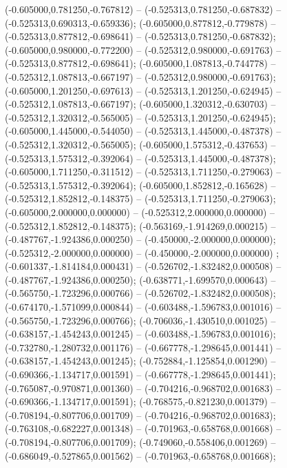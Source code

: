 (-0.605000,0.781250,-0.767812) -- (-0.525313,0.781250,-0.687832) -- (-0.525313,0.690313,-0.659336);
 (-0.605000,0.877812,-0.779878) -- (-0.525313,0.877812,-0.698641) -- (-0.525313,0.781250,-0.687832);
 (-0.605000,0.980000,-0.772200) -- (-0.525312,0.980000,-0.691763) -- (-0.525313,0.877812,-0.698641);
 (-0.605000,1.087813,-0.744778) -- (-0.525312,1.087813,-0.667197) -- (-0.525312,0.980000,-0.691763);
 (-0.605000,1.201250,-0.697613) -- (-0.525313,1.201250,-0.624945) -- (-0.525312,1.087813,-0.667197);
 (-0.605000,1.320312,-0.630703) -- (-0.525312,1.320312,-0.565005) -- (-0.525313,1.201250,-0.624945);
 (-0.605000,1.445000,-0.544050) -- (-0.525313,1.445000,-0.487378) -- (-0.525312,1.320312,-0.565005);
 (-0.605000,1.575312,-0.437653) -- (-0.525313,1.575312,-0.392064) -- (-0.525313,1.445000,-0.487378);
 (-0.605000,1.711250,-0.311512) -- (-0.525313,1.711250,-0.279063) -- (-0.525313,1.575312,-0.392064);
 (-0.605000,1.852812,-0.165628) -- (-0.525312,1.852812,-0.148375) -- (-0.525313,1.711250,-0.279063);
 (-0.605000,2.000000,0.000000) -- (-0.525312,2.000000,0.000000) -- (-0.525312,1.852812,-0.148375);
 (-0.563169,-1.914269,0.000215) -- (-0.487767,-1.924386,0.000250) -- (-0.450000,-2.000000,0.000000);
 (-0.525312,-2.000000,0.000000) -- (-0.450000,-2.000000,0.000000) ;
 (-0.601337,-1.814184,0.000431) -- (-0.526702,-1.832482,0.000508) -- (-0.487767,-1.924386,0.000250);
 (-0.638771,-1.699570,0.000643) -- (-0.565750,-1.723296,0.000766) -- (-0.526702,-1.832482,0.000508);
 (-0.674170,-1.571099,0.000844) -- (-0.603488,-1.596783,0.001016) -- (-0.565750,-1.723296,0.000766);
 (-0.706036,-1.430510,0.001025) -- (-0.638157,-1.454243,0.001245) -- (-0.603488,-1.596783,0.001016);
 (-0.732780,-1.280732,0.001176) -- (-0.667778,-1.298645,0.001441) -- (-0.638157,-1.454243,0.001245);
 (-0.752884,-1.125854,0.001290) -- (-0.690366,-1.134717,0.001591) -- (-0.667778,-1.298645,0.001441);
 (-0.765087,-0.970871,0.001360) -- (-0.704216,-0.968702,0.001683) -- (-0.690366,-1.134717,0.001591);
 (-0.768575,-0.821230,0.001379) -- (-0.708194,-0.807706,0.001709) -- (-0.704216,-0.968702,0.001683);
 (-0.763108,-0.682227,0.001348) -- (-0.701963,-0.658768,0.001668) -- (-0.708194,-0.807706,0.001709);
 (-0.749060,-0.558406,0.001269) -- (-0.686049,-0.527865,0.001562) -- (-0.701963,-0.658768,0.001668);
